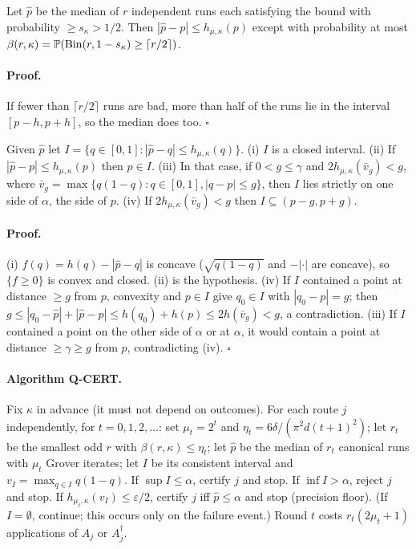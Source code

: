 \begin{lemma}[Median]\label{lem:median}
Let $\hat p$ be the median of $r$ independent runs each satisfying the bound with probability $\ge s_\kappa>1/2$. Then $|\hat p-p|\le h_{\mu,\kappa}(p)$ except with probability at most $\beta(r,\kappa)=\P(\mathrm{Bin}(r,1-s_\kappa)\ge\lceil r/2\rceil)$.
\end{lemma}
\paragraph{Proof.} If fewer than $\lceil r/2\rceil$ runs are bad, more than half of the runs lie in the interval $[p-h,p+h]$, so the median does too. \hfill$\square$

\begin{lemma}\label{lem:interval}
Given $\hat p$ let $I=\{q\in[0,1]:|\hat p-q|\le h_{\mu,\kappa}(q)\}$. (i) $I$ is a closed interval. (ii) If $|\hat p-p|\le h_{\mu,\kappa}(p)$ then $p\in I$. (iii) In that case, if $0<g\le\gamma$ and $2h_{\mu,\kappa}(\bar v_g)<g$, where $\bar v_g=\max\{q(1-q):q\in[0,1],|q-p|\le g\}$, then $I$ lies strictly on one side of $\alpha$, the side of $p$. (iv) If $2h_{\mu,\kappa}(\bar v_g)<g$ then $I\subseteq(p-g,p+g)$.
\end{lemma}
\paragraph{Proof.} (i) $f(q)=h(q)-|\hat p-q|$ is concave ($\sqrt{q(1-q)}$ and $-|\cdot|$ are concave), so $\{f\ge0\}$ is convex and closed. (ii) is the hypothesis. (iv) If $I$ contained a point at distance $\ge g$ from $p$, convexity and $p\in I$ give $q_0\in I$ with $|q_0-p|=g$; then $g\le|q_0-\hat p|+|\hat p-p|\le h(q_0)+h(p)\le2h(\bar v_g)<g$, a contradiction. (iii) If $I$ contained a point on the other side of $\alpha$ or at $\alpha$, it would contain a point at distance $\ge\gamma\ge g$ from $p$, contradicting (iv). \hfill$\square$

\paragraph{Algorithm Q-CERT.} Fix $\kappa$ in advance (it must not depend on outcomes). For each route $j$ independently, for $t=0,1,2,\dots$: set $\mu_t=2^t$ and $\eta_t=6\delta/(\pi^2d(t+1)^2)$; let $r_t$ be the smallest odd $r$ with $\beta(r,\kappa)\le\eta_t$; let $\hat p$ be the median of $r_t$ canonical runs with $\mu_t$ Grover iterates; let $I$ be its consistent interval and $v_I=\max_{q\in I}q(1-q)$. If $\sup I\le\alpha$, certify $j$ and stop. If $\inf I>\alpha$, reject $j$ and stop. If $h_{\mu_t,\kappa}(v_I)\le\varepsilon/2$, certify $j$ iff $\hat p\le\alpha$ and stop (precision floor). (If $I=\emptyset$, continue; this occurs only on the failure event.) Round $t$ costs $r_t(2\mu_t+1)$ applications of $A_j$ or $A_j^\dagger$.

